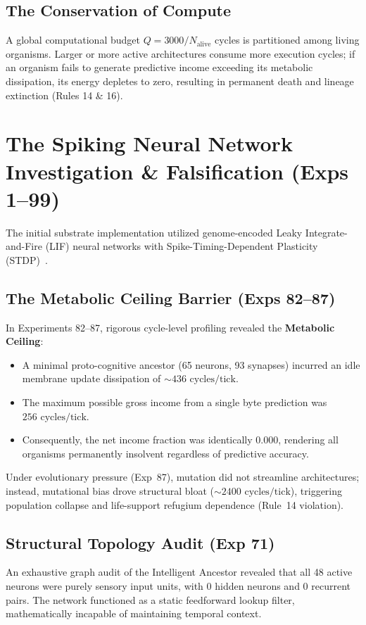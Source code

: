 \documentclass[10pt,journal,compsoc]{IEEEtran}
\begin{document}
\subsection{The Conservation of Compute}
A global computational budget $Q = 3000 / N_{\text{alive}}$ cycles is partitioned among living organisms. Larger or more active architectures consume more execution cycles; if an organism fails to generate predictive income exceeding its metabolic dissipation, its energy depletes to zero, resulting in permanent death and lineage extinction (Rules 14 \& 16).

\section{The Spiking Neural Network Investigation \& Falsification (Exps 1--99)}
\label{sec:snn}

The initial substrate implementation utilized genome-encoded Leaky Integrate-and-Fire (LIF) neural networks with Spike-Timing-Dependent Plasticity (STDP)~\cite{bellec2020solution}.

\subsection{The Metabolic Ceiling Barrier (Exps 82--87)}
In Experiments 82--87, rigorous cycle-level profiling revealed the \textbf{Metabolic Ceiling}:
\begin{itemize}
    \item A minimal proto-cognitive ancestor (65 neurons, 93 synapses) incurred an idle membrane update dissipation of $\sim 436\text{ cycles/tick}$.
    \item The maximum possible gross income from a single byte prediction was $256\text{ cycles/tick}$.
    \item Consequently, the net income fraction was identically $0.000$, rendering all organisms permanently insolvent regardless of predictive accuracy.
\end{itemize}
Under evolutionary pressure (Exp~87), mutation did not streamline architectures; instead, mutational bias drove structural bloat ($\sim 2400\text{ cycles/tick}$), triggering population collapse and life-support refugium dependence (Rule~14 violation).

\subsection{Structural Topology Audit (Exp 71)}
An exhaustive graph audit of the Intelligent Ancestor revealed that all 48 active neurons were purely sensory input units, with $0$ hidden neurons and $0$ recurrent pairs. The network functioned as a static feedforward lookup filter, mathematically incapable of maintaining temporal context.
\end{document}
